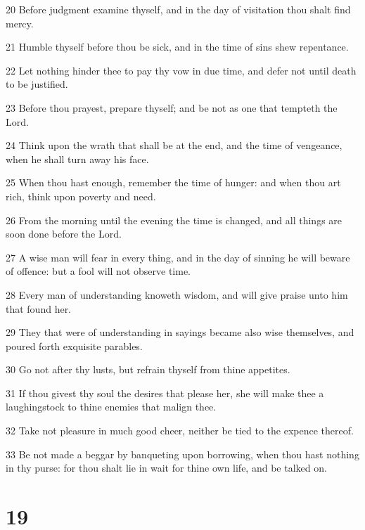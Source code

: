 \par 20 Before judgment examine thyself, and in the day of visitation thou shalt find mercy.
\par 21 Humble thyself before thou be sick, and in the time of sins shew repentance.
\par 22 Let nothing hinder thee to pay thy vow in due time, and defer not until death to be justified.
\par 23 Before thou prayest, prepare thyself; and be not as one that tempteth the Lord.
\par 24 Think upon the wrath that shall be at the end, and the time of vengeance, when he shall turn away his face.
\par 25 When thou hast enough, remember the time of hunger: and when thou art rich, think upon poverty and need.
\par 26 From the morning until the evening the time is changed, and all things are soon done before the Lord.
\par 27 A wise man will fear in every thing, and in the day of sinning he will beware of offence: but a fool will not observe time.
\par 28 Every man of understanding knoweth wisdom, and will give praise unto him that found her.
\par 29 They that were of understanding in sayings became also wise themselves, and poured forth exquisite parables.
\par 30 Go not after thy lusts, but refrain thyself from thine appetites.
\par 31 If thou givest thy soul the desires that please her, she will make thee a laughingstock to thine enemies that malign thee.
\par 32 Take not pleasure in much good cheer, neither be tied to the expence thereof.
\par 33 Be not made a beggar by banqueting upon borrowing, when thou hast nothing in thy purse: for thou shalt lie in wait for thine own life, and be talked on.

\chapter{19}

